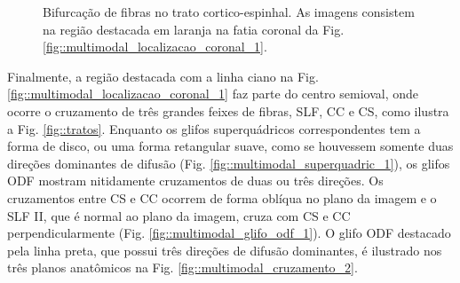  \begin{figure}[H]
\centering
    \caption{Bifurcação de fibras no trato cortico-espinhal. As imagens consistem na região destacada em laranja na fatia coronal da Fig. \ref{fig::multimodal_localizacao_coronal_1}. %
    }
    \label{fig::multimodal_fanning}
\end{figure}

Finalmente, a região destacada com a linha ciano na Fig. \ref{fig::multimodal_localizacao_coronal_1} faz parte do centro semioval, onde ocorre o cruzamento de três grandes feixes de fibras, SLF, CC e CS, como ilustra a Fig. \ref{fig::tratos}. Enquanto os glifos superquádricos correspondentes tem a forma de disco, ou uma forma retangular suave, como se houvessem somente duas direções dominantes de difusão (Fig. \ref{fig::multimodal_superquadric_1}), os glifos ODF mostram nitidamente cruzamentos de duas ou três direções. Os cruzamentos entre CS e CC ocorrem de forma oblíqua no plano da imagem e o SLF II, que é normal ao plano da imagem, cruza com CS e CC perpendicularmente (Fig. \ref{fig::multimodal_glifo_odf_1}). O glifo ODF destacado pela linha preta, que possui três direções de difusão dominantes, é ilustrado nos três planos anatômicos na Fig. \ref{fig::multimodal_cruzamento_2}. 

